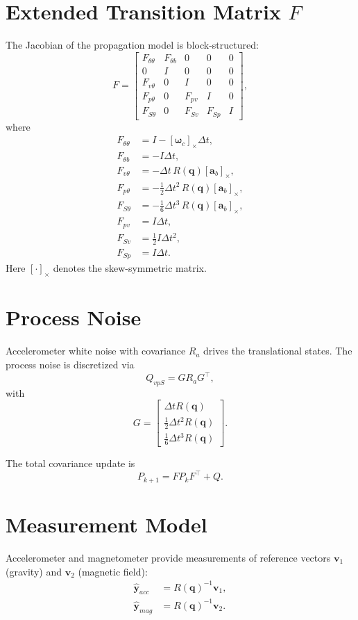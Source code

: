 \documentclass[11pt]{article}
\begin{document}
\section{Extended Transition Matrix $F$}
The Jacobian of the propagation model is block-structured:
\[
F = \begin{bmatrix}
F_{\theta\theta} & F_{\theta b} & 0 & 0 & 0 \\
0 & I & 0 & 0 & 0 \\
F_{v\theta} & 0 & I & 0 & 0 \\
F_{p\theta} & 0 & F_{pv} & I & 0 \\
F_{S\theta} & 0 & F_{Sv} & F_{Sp} & I
\end{bmatrix},
\]
where
\begin{align}
F_{\theta\theta} &= I - [\bm{\omega}_c]_\times \Delta t, \\
F_{\theta b} &= -I \Delta t, \\
F_{v\theta} &= -\Delta t \, R(\bm{q}) [\bm{a}_b]_\times, \\
F_{p\theta} &= -\tfrac{1}{2}\Delta t^2 \, R(\bm{q}) [\bm{a}_b]_\times, \\
F_{S\theta} &= -\tfrac{1}{6}\Delta t^3 \, R(\bm{q}) [\bm{a}_b]_\times, \\
F_{pv} &= I \Delta t, \\
F_{Sv} &= \tfrac{1}{2} I \Delta t^2, \\
F_{Sp} &= I \Delta t.
\end{align}
Here $[\cdot]_\times$ denotes the skew-symmetric matrix.

\section{Process Noise}
Accelerometer white noise with covariance $R_a$ drives the translational states. The process noise is discretized via
\[
Q_{vpS} = G R_a G^\top,
\]
with
\[
G = \begin{bmatrix}
\Delta t R(\bm{q}) \\
\tfrac{1}{2}\Delta t^2 R(\bm{q}) \\
\tfrac{1}{6}\Delta t^3 R(\bm{q})
\end{bmatrix}.
\]

The total covariance update is
\[
P_{k+1} = F P_k F^\top + Q.
\]

\section{Measurement Model}
Accelerometer and magnetometer provide measurements of reference vectors $\bm{v}_1$ (gravity) and $\bm{v}_2$ (magnetic field):
\begin{align}
\hat{\bm{y}}_{acc} &= R(\bm{q})^{-1} \bm{v}_1, \\
\hat{\bm{y}}_{mag} &= R(\bm{q})^{-1} \bm{v}_2.
\end{align}
\end{document}
